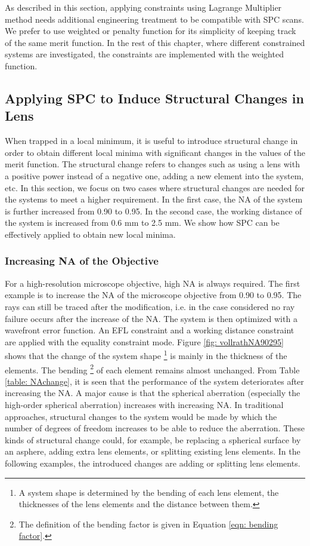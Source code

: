 As described in this section, applying constraints using Lagrange Multiplier method needs additional engineering treatment to be compatible with SPC scans. We prefer to use weighted or penalty function for its simplicity of keeping track of the same merit function. In the rest of this chapter, where different constrained systems are investigated, the constraints are implemented with the weighted function.

\subsection{Applying SPC to Induce Structural Changes in Lens}
When trapped in a local minimum, it is useful to introduce structural change in order to obtain different local minima with significant changes in the values of the merit function. The structural change refers to changes such as using a lens with a positive power instead of a negative one, adding a new element into the system, etc. In this section, we focus on two cases where structural changes are needed for the systems to meet a higher requirement. In the first case, the NA of the system is further increased from 0.90 to 0.95. In the second case, the working distance of the system is increased from 0.6 mm to 2.5 mm. We show how SPC can be effectively applied to obtain new local minima. 

\subsubsection{Increasing NA of the Objective}
For a high-resolution microscope objective, high NA is always required. The first example is to increase the NA of the microscope objective from 0.90 to 0.95. The rays can still be traced after the modification, i.e. in the case considered no ray failure occurs after the increase of the NA. The system is then optimized with a wavefront error function. An EFL constraint and a working distance constraint are applied with the equality constraint mode. Figure \ref{fig: vollrathNA90295} shows that the change of the system shape \footnote{A system shape is determined by the bending of each lens element, the thicknesses of the lens elements and  the distance between them.} is mainly in the thickness of the elements. The bending \footnote{The definition of the bending factor is given in Equation \ref{eqn: bending factor}.} of each element remains almost unchanged. From Table \ref{table: NAchange}, it is seen that the performance of the system deteriorates after increasing the NA. A major cause is that the spherical aberration (especially the high-order spherical aberration) increases with increasing NA. In traditional approaches, structural changes to the system would be made by which the number of degrees of freedom increases to be able to reduce the aberration. These kinds of structural change could, for example, be replacing a spherical surface by an asphere, adding extra lens elements, or splitting existing lens elements. In the following examples, the introduced changes are adding or splitting lens elements.

